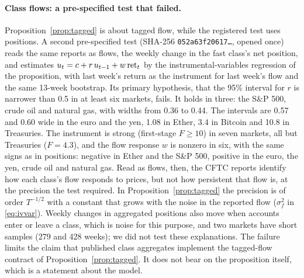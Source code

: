 \paragraph{Class flows: a pre-specified test that failed.} Proposition~\ref{prop:tagged} is about tagged flow, while the registered test uses positions. A second pre-specified test (SHA-256 \texttt{052a63f20617\ldots}, opened once) reads the same reports as flows, the weekly change in the fast class's net position, and estimates $u_t=c+r\,u_{t-1}+w\,{\rm ret}_t$ by the instrumental-variables regression of the proposition, with last week's return as the instrument for last week's flow and the same 13-week bootstrap. Its primary hypothesis, that the 95\% interval for $r$ is narrower than 0.5 in at least six markets, fails. It holds in three: the S\&P 500, crude oil and natural gas, with widths from 0.36 to 0.44. The intervals are 0.57 and 0.60 wide in the euro and the yen, 1.08 in Ether, 3.4 in Bitcoin and 10.8 in Treasuries. The instrument is strong (first-stage $F\ge10$) in seven markets, all but Treasuries ($F=4.3$), and the flow response $w$ is nonzero in six, with the same signs as in positions: negative in Ether and the S\&P 500, positive in the euro, the yen, crude oil and natural gas. Read as flows, then, the CFTC reports identify how each class's flow responds to prices, but not how persistent that flow is, at the precision the test required. In Proposition~\ref{prop:tagged} the precision is of order $T^{-1/2}$ with a constant that grows with the noise in the reported flow ($\sigma_f^2$ in \eqref{eq:ivvar}). Weekly changes in aggregated positions also move when accounts enter or leave a class, which is noise for this purpose, and two markets have short samples (279 and 428 weeks); we did not test these explanations. The failure limits the claim that published class aggregates implement the tagged-flow contract of Proposition~\ref{prop:tagged}. It does not bear on the proposition itself, which is a statement about the model.

